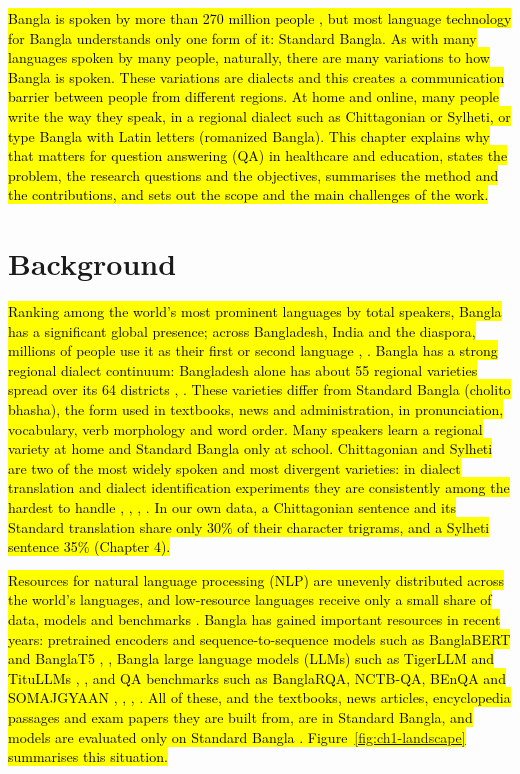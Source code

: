 \hl{Bangla is spoken by more than 270 million people \cite{jawad2026fivedialects}, but most
language technology for Bangla understands only one form of it: Standard
Bangla. As with many languages spoken by many people, naturally, there
are many variations to how Bangla is spoken. These variations are
dialects and this creates a communication barrier between people from
different regions. At home and online, many people write the way they
speak, in a regional dialect such as Chittagonian or Sylheti, or type
Bangla with Latin letters (romanized Bangla). This chapter explains why
that matters for question answering (QA) in healthcare and education,
states the problem, the research questions and the objectives,
summarises the method and the contributions, and sets out the scope and
the main challenges of the work.}

\section{Background}\label{background}

\hl{Ranking among the world's most prominent languages by total
speakers, Bangla has a significant global presence; across Bangladesh,
India and the diaspora, millions of people use it as their first or
second language \cite{shafayat2024benqa}, \cite{jawad2026fivedialects}. Bangla has a strong regional dialect
continuum: Bangladesh alone has about 55 regional varieties spread over
its 64 districts \cite{faria2023vashantor}, \cite{samin2024bangladialecto}. These varieties differ from Standard
Bangla (cholito bhasha), the form used in textbooks, news and
administration, in pronunciation, vocabulary, verb morphology and word
order. Many speakers learn a regional variety at home and Standard
Bangla only at school. Chittagonian and Sylheti are two of the most
widely spoken and most divergent varieties: in dialect translation and
dialect identification experiments they are consistently among the
hardest to handle \cite{jawad2026fivedialects}, \cite{faria2023vashantor}, \cite{khandaker2024bridging}, \cite{prantik2025}. In our own data, a
Chittagonian sentence and its Standard translation share only 30\% of
their character trigrams, and a Sylheti sentence 35\% (Chapter 4).}

\hl{Resources for natural language processing (NLP) are unevenly
distributed across the world's languages, and low-resource languages
receive only a small share of data, models and benchmarks \cite{joshi2020state}.
Bangla has gained important resources in recent years: pretrained
encoders and sequence-to-sequence models such as BanglaBERT and BanglaT5
\cite{bhattacharjee2022banglabert}, \cite{bhattacharjee2023banglanlg}, Bangla large language models (LLMs) such as TigerLLM
and TituLLMs \cite{raihan2025tigerllm}, \cite{titulm2025}, and QA benchmarks such as BanglaRQA,
NCTB-QA, BEnQA and SOMAJGYAAN \cite{ekram2022banglarqa}, \cite{nctbqa}, \cite{shafayat2024benqa}, \cite{shifa2025somajgyaan}. All
of these, and the textbooks, news articles, encyclopedia passages and
exam papers they are built from, are in Standard Bangla, and models are
evaluated only on Standard Bangla \cite{jawad2026fivedialects}. Figure~\ref{fig:ch1-landscape} summarises this
situation.}

